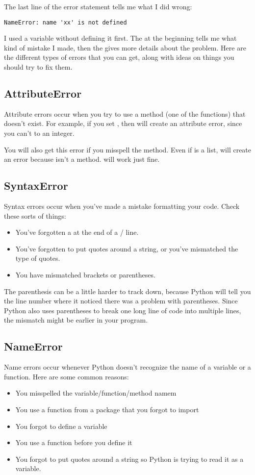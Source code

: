 The last line of the error statement tells me what I did wrong:
\begin{Verbatim}
NameError: name 'xx' is not defined
\end{Verbatim}
I used a variable  without defining it first. The  at the beginning tells me what kind of mistake I made, then the  gives more details about the problem.  Here are the different types of errors that you can get, along with ideas on things you should try to fix them.

\subsection*{AttributeError}
Attribute errors occur when you try to use a method (one of the  functions) that doesn't exist.  For example,  if you set , then  will create an attribute error, since you can't  to an integer.

You will also get this error if you misspell the method.  Even if  is a list,  will create an error because  isn't a method.   will work just fine.

\subsection*{SyntaxError}
Syntax errors occur when you've made a mistake formatting your code.  Check these sorts of things:
\begin{itemize}
\item You've forgotten a \code{:} at the end of a / line.
\item You've forgotten to put quotes around a string, or you've mismatched the type of quotes.
\item You have mismatched brackets or parentheses.
\end{itemize}
The parenthesis can be a little harder to track down, because Python will tell you the line number where it noticed there was a problem with parentheses.  Since Python also uses parentheses to break one long line of code into multiple lines, the mismatch might be earlier in your program.

\subsection*{NameError}
Name errors occur whenever Python doesn't recognize the name of a variable or a function.  Here are some common reasons:
\begin{itemize}
\item You misspelled the variable/function/method namem
\item You use a function from a package that you forgot to import
\item You forgot to define a variable
\item You use a function before you define it
\item You forgot to put quotes around a string so Python is trying to read it as a variable.
\end{itemize}

